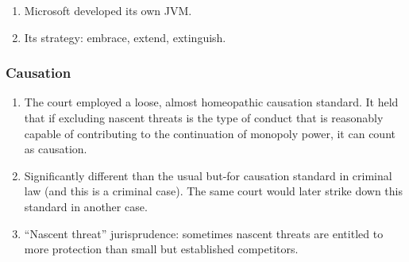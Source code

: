 \begin{enumerate}
    \item Microsoft developed its own JVM.
    \item Its strategy: embrace, extend, extinguish.
\end{enumerate}

\subsubsection{Causation}

\begin{enumerate}
    \item The court employed a loose, almost homeopathic causation standard. 
    It held that if excluding nascent threats is the type of conduct that is 
    reasonably capable of contributing to the continuation of monopoly power, 
    it can count as causation.
    \item Significantly different than the usual but-for causation standard in 
    criminal law (and this is a criminal case). The same court would later 
    strike down this standard in another case.
    \item ``Nascent threat'' jurisprudence: sometimes nascent threats are 
    entitled to more protection than small but established competitors.
\end{enumerate}
